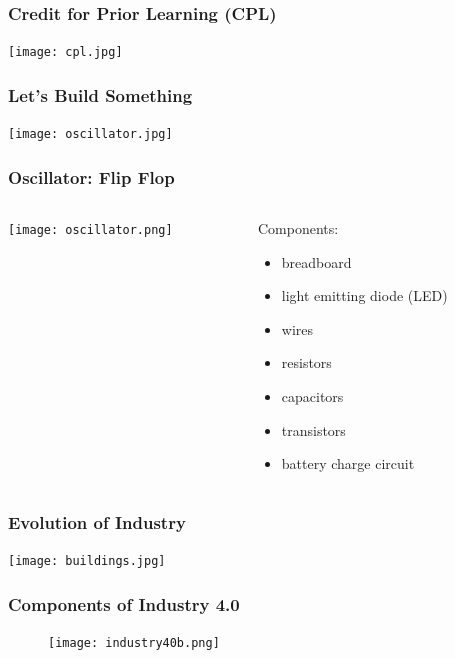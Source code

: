 \documentclass{beamer}
\begin{document}
\begin{frame}\frametitle{Credit for Prior Learning (CPL)}
	\begin{center}	
	\texttt{[image: cpl.jpg]} 
	\end{center}
\end{frame}

\begin{frame}\frametitle{Let's Build Something}
	\begin{center}	
	\texttt{[image: oscillator.jpg]} 
	\end{center}
\end{frame}

\begin{frame}\frametitle{Oscillator: Flip Flop}
\begin{columns}
\begin{column}{5.5cm}
	\begin{center}	
	\texttt{[image: oscillator.png]} 
	\end{center}
\end{column}
\begin{column}{5.5cm}
Components:
\begin{itemize}
\item breadboard
\item light emitting diode (LED)
\item wires
\item resistors
\item capacitors
\item transistors
\item battery charge circuit
\end{itemize}
\end{column}
\end{columns}
\end{frame}


\begin{frame}\frametitle{Evolution of Industry}
	\begin{center}	
	\texttt{[image: buildings.jpg]} 
	\end{center}
\end{frame}

\begin{frame}\frametitle{Components of Industry 4.0}
\begin{figure}[h]
	\begin{center}	
	\texttt{[image: industry40b.png]}
	\label{fig:ind40b} 
	\end{center}
\end{figure}
\end{frame}
\end{document}

